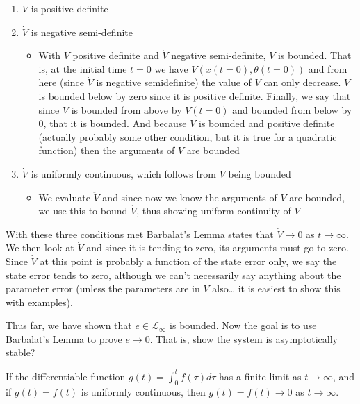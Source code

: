 \begin{enumerate}
  \item{$V$ is positive definite}
  \item{$\dot{V}$ is negative semi-definite}
  \begin{itemize}
    \item{With $V$ positive definite and $\dot{V}$ negative semi-definite, $V$ is bounded.
    That is, at the initial time $t=0$ we have $V(x(t=0),\theta(t=0))$ and from here (since $\dot{V}$ is negative semidefinite) the value of $V$ can only decrease.
    $V$ is bounded below by zero since it is positive definite.
    Finally, we say that since $V$ is bounded from above by $V(t=0)$ and bounded from below by 0, that it is bounded.
    And because $V$ is bounded and positive definite (actually probably some other condition, but it is true for a quadratic function) then the arguments of $V$ are bounded}
  \end{itemize}
  \item{$\dot{V}$ is uniformly continuous, which follows from $\ddot{V}$ being bounded}
  \begin{itemize}
    \item{We evaluate $\ddot{V}$ and since now we know the arguments of $V$ are bounded, we use this to bound $\ddot{V}$, thus showing uniform continuity of $\dot{V}$}
  \end{itemize}
\end{enumerate}
With these three conditions met Barbalat's Lemma states that $\dot{V}\rightarrow0$ as $t\rightarrow\infty$.
We then look at $\dot{V}$ and since it is tending to zero, its arguments must go to zero.
Since $\dot{V}$ at this point is probably a function of the state error only, we say the state error tends to zero, although we can't necessarily say anything about the parameter error (unless the parameters are in $\dot{V}$ also\ldots
it is easiest to show this with examples).

Thus far, we have shown that $e\in\mathcal{L}_{\infty}$ is bounded.
Now the goal is to use Barbalat's Lemma to prove $e\rightarrow0$.
That is, show the system is asymptotically stable?

\begin{lem-dan}[Slotine pg 122]
  If the differentiable function $g(t)=\int_{0}^{t}f(\tau)d\tau$ has a finite limit as $t\rightarrow\infty$, and if $\dot{g}(t)=f(t)$ is uniformly continuous, then $\dot{g}(t)=f(t)\rightarrow0$ as $t\rightarrow\infty$.
\end{lem-dan}

